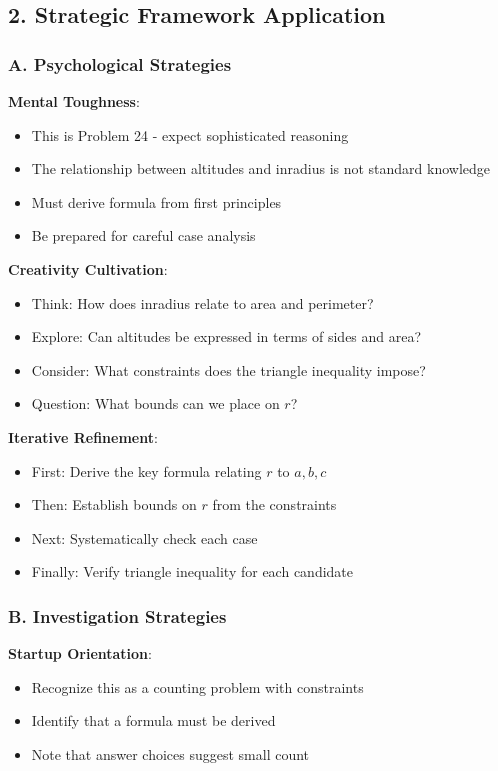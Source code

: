 \documentclass[12pt]{article}
\begin{document}
\begin{strategicbox}
\subsection*{2. Strategic Framework Application}

\subsubsection*{A. Psychological Strategies}

\textbf{Mental Toughness}:
\begin{itemize}
    \item This is Problem 24 - expect sophisticated reasoning
    \item The relationship between altitudes and inradius is not standard knowledge
    \item Must derive formula from first principles
    \item Be prepared for careful case analysis
\end{itemize}

\textbf{Creativity Cultivation}:
\begin{itemize}
    \item Think: How does inradius relate to area and perimeter?
    \item Explore: Can altitudes be expressed in terms of sides and area?
    \item Consider: What constraints does the triangle inequality impose?
    \item Question: What bounds can we place on $r$?
\end{itemize}

\textbf{Iterative Refinement}:
\begin{itemize}
    \item First: Derive the key formula relating $r$ to $a, b, c$
    \item Then: Establish bounds on $r$ from the constraints
    \item Next: Systematically check each case
    \item Finally: Verify triangle inequality for each candidate
\end{itemize}

\subsubsection*{B. Investigation Strategies}

\textbf{Startup Orientation}:
\begin{itemize}
    \item Recognize this as a counting problem with constraints
    \item Identify that a formula must be derived
    \item Note that answer choices suggest small count
\end{itemize}


\end{strategicbox}
\end{document}
